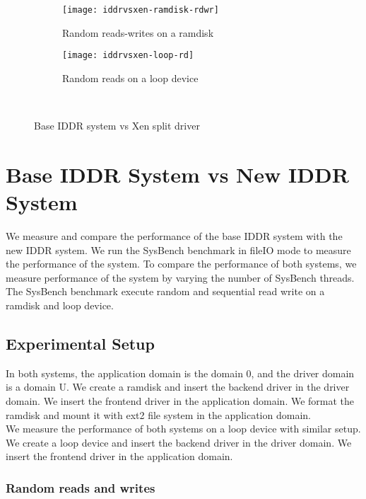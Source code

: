 \begin{figure}[!ht]
  \begin{subfigure}[b]{0.2\textwidth}
  \texttt{[image: iddrvsxen-ramdisk-rdwr]}
  \caption{Random reads-writes on a ramdisk}
  \label{fig:iddrvsxen-ramdisk-rdwr}
  \end{subfigure}
  \hspace{50mm}
  \begin{subfigure}[b]{0.2\textwidth}
  \texttt{[image: iddrvsxen-loop-rd]}
  \caption{Random reads on a loop device}
  \label{fig:iddrvsxen-loop-rd}
  \end{subfigure}\\
\caption{Base IDDR system vs Xen split driver}\label{fig:seqloopdisk}
\end{figure}

\section{Base IDDR System vs New IDDR System}
We measure and compare the performance of the base IDDR system with the new IDDR system. We run the SysBench benchmark in fileIO mode to measure the performance of the system. To compare the performance of both systems, we measure performance of the system by varying the number of SysBench threads. The SysBench benchmark execute random and sequential read write on a ramdisk and loop device. 
\subsection*{Experimental Setup}
In both systems, the application domain is the domain 0, and the driver domain is a domain U. We create a ramdisk and insert the backend driver in the driver domain. We insert the frontend driver in the application domain. We format the ramdisk and mount it with ext2 file system in the application domain. 
\\[3mm]
We measure the performance of both systems on a loop device with similar setup. We create a loop device and insert the backend driver in the driver domain. We insert the frontend driver in the application domain. %

\subsubsection*{Random reads and writes}

